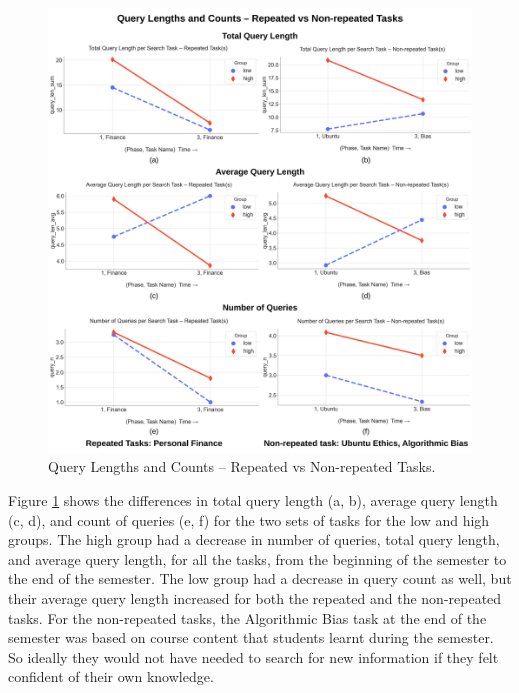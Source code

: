 \documentclass[letterpaper, nobind]{templates/ociamthesis}
\begin{document}
\begin{figure}

{\centering \includegraphics[width=1\linewidth]{figs/rp13-query-length-count} 

}

\caption[Query Lengths and Counts -- Repeated vs Non-repeated Tasks.]{Query Lengths and Counts -- Repeated vs Non-repeated Tasks.}\label{fig:rp13-query-length-count}
\end{figure}





Figure \ref{fig:rp13-query-length-count} shows the differences in total query length (a, b), average query length (c, d), and count of queries (e, f) for the two sets of tasks for the low and high groups.
The high group had a decrease in number of queries, total query length, and average query length, for all the tasks, from the beginning of the semester to the end of the semester.
The low group had a decrease in query count as well, but their average query length increased for both the repeated and the non-repeated tasks.
For the non-repeated tasks, the Algorithmic Bias task at the end of the semester was based on course content that students learnt during the semester.
So ideally they would not have needed to search for new information if they felt confident of their own knowledge.
\end{document}
